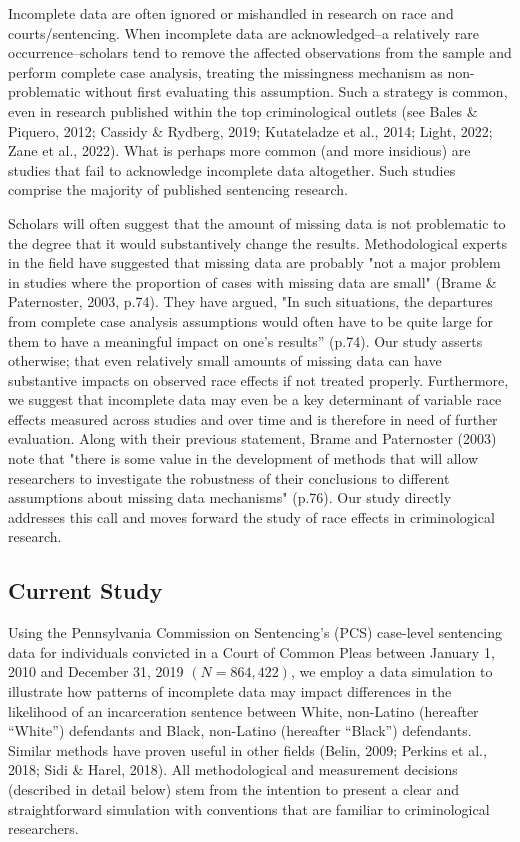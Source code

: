\documentclass[titlepage]{article}
\begin{document}
Incomplete data are often ignored or mishandled in research on race and courts/sentencing. When incomplete data are acknowledged--a relatively rare occurrence--scholars tend to remove the affected observations from the sample and perform complete case analysis, treating the missingness mechanism as non-problematic without first evaluating this assumption. Such a strategy is common, even in research published within the top criminological outlets (see Bales \& Piquero, 2012; Cassidy \& Rydberg, 2019; Kutateladze et al., 2014; Light, 2022; Zane et al., 2022). What is perhaps more common (and more insidious) are studies that fail to acknowledge incomplete data altogether. Such studies comprise the majority of published sentencing research.

Scholars will often suggest that the amount of missing data is not problematic to the degree that it would substantively change the results. Methodological experts in the field have suggested that missing data are probably "not a major problem in studies where the proportion of cases with missing data are small" (Brame \& Paternoster, 2003, p.74). They have argued, "In such situations, the departures from complete case analysis assumptions would often have to be quite large for them to have a meaningful impact on one’s results'' (p.74). Our study asserts otherwise; that even relatively small amounts of missing data can have substantive impacts on observed race effects if not treated properly. Furthermore, we suggest that incomplete data may even be a key determinant of variable race effects measured across studies and over time and is therefore in need of further evaluation. Along with their previous statement, Brame and Paternoster (2003) note that "there is some value in the development of methods that will allow researchers to investigate the robustness of their conclusions to different assumptions about missing data mechanisms" (p.76). Our study directly addresses this call and moves forward the study of race effects in criminological research.

\subsection{Current Study}

Using the Pennsylvania Commission on Sentencing’s (PCS) case-level sentencing data for individuals convicted in a Court of Common Pleas between January 1, 2010 and December 31, 2019 \((N = 864,422)\), we employ a data simulation to illustrate how patterns of incomplete data may impact differences in the likelihood of an incarceration sentence between White, non-Latino   (hereafter “White”) defendants and Black, non-Latino (hereafter “Black”) defendants. Similar methods have proven useful in other fields (Belin, 2009; Perkins et al., 2018; Sidi \& Harel, 2018). All methodological and measurement decisions (described in detail below) stem from the intention to present a clear and straightforward simulation with conventions that are familiar to criminological researchers.
\end{document}
